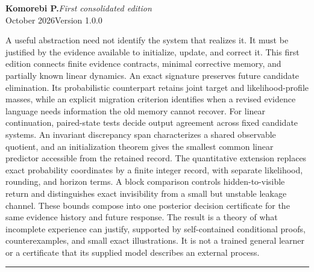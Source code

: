 \documentclass[11pt,letterpaper]{article}
\theoremstyle{plain}
\theoremstyle{definition}
\begin{document}
\hypersetup{pageanchor=false}
\begin{titlepage}\thispagestyle{empty}
\vspace*{.25in}
\par
\vspace{.65in}
\vspace{.20in}
\vspace{.28in}\noindent{\color{ink}\rule{\textwidth}{.85pt}}\par
\vspace{.16in}
\noindent\textbf{Komorebi P.}\hfill\textit{First consolidated edition}\\
 October 2026\hfill Version 1.0.0\par
\vspace{.46in}
\par\smallskip
\noindent A useful abstraction need not identify the system that realizes it. It must be justified by the evidence available to initialize, update, and correct it. This first edition connects finite evidence contracts, minimal corrective memory, and partially known linear dynamics. An exact signature preserves future candidate elimination. Its probabilistic counterpart retains joint target and likelihood-profile masses, while an explicit migration criterion identifies when a revised evidence language needs information the old memory cannot recover. For linear continuation, paired-state tests decide output agreement across fixed candidate systems. An invariant discrepancy span characterizes a shared observable quotient, and an initialization theorem gives the smallest common linear predictor accessible from the retained record. The quantitative extension replaces exact probability coordinates by a finite integer record, with separate likelihood, rounding, and horizon terms. A block comparison controls hidden-to-visible return and distinguishes exact invisibility from a small but unstable leakage channel. These bounds compose into one posterior decision certificate for the same evidence history and future response. The result is a theory of what incomplete experience can justify, supported by self-contained conditional proofs, counterexamples, and small exact illustrations. It is not a trained general learner or a certificate that its supplied model describes an external process.
\vfill
\noindent\rule{\textwidth}{.4pt}\par\smallskip
{}
\end{titlepage}
\end{document}
